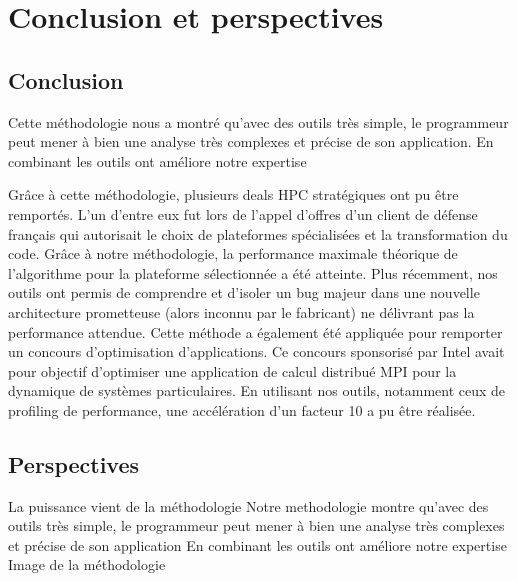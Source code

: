 \section{Conclusion et perspectives}\label{sec:methodo_conclusion}

\subsection{Conclusion}

Cette méthodologie nous a montré qu'avec des outils très simple, le programmeur peut mener à bien une analyse très complexes et précise de son application.
En combinant les outils ont améliore notre expertise

Grâce à cette méthodologie, plusieurs deals HPC stratégiques ont pu être remportés. L’un d’entre eux fut lors de l’appel d’offres d’un client de défense français qui autorisait le choix de plateformes spécialisées et la transformation du code. Grâce à notre méthodologie, la performance maximale théorique de l’algorithme pour la plateforme sélectionnée a été atteinte. Plus récemment, nos outils ont permis de comprendre et d’isoler un bug majeur dans une nouvelle architecture prometteuse (alors inconnu par le fabricant) ne délivrant pas la performance attendue. Cette méthode a également été appliquée pour remporter un concours d’optimisation d’applications. Ce concours sponsorisé par Intel avait pour objectif d’optimiser une application de calcul distribué MPI pour la dynamique de systèmes particulaires. En utilisant nos outils, notamment ceux de profiling de performance, une accélération d’un facteur 10 a pu être réalisée.


\subsection{Perspectives}




        La puissance vient de la méthodologie
            Notre methodologie montre qu'avec des outils très simple, le programmeur peut mener à bien une analyse très complexes et précise de son application
            En combinant les outils ont améliore notre expertise
            Image de la méthodologie
        
